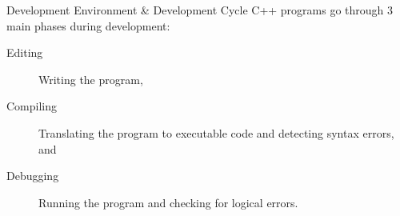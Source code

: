 \documentclass[../lecture1-introduction.tex]{subfiles}
\begin{document}
\begin{frame}[fragile]{Development Environment \& Development Cycle}
    C++ programs go through 3 main phases during development:
    \begin{description}
        \item [Editing] Writing the program,
        \item [Compiling] Translating the program to executable code and detecting
        syntax errors, and
        \item [Debugging] Running the program and checking for logical errors.
    \end{description}
\end{frame}

\end{document}

